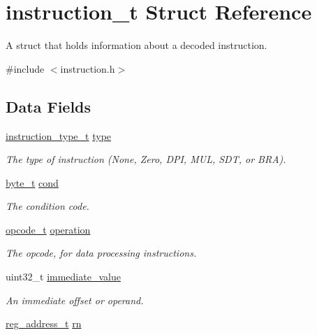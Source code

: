 \hypertarget{structinstruction__t}{}\section{instruction\+\_\+t Struct Reference}
\label{structinstruction__t}


A struct that holds information about a decoded instruction.  




{\ttfamily \#include $<$instruction.\+h$>$}

\subsection*{Data Fields}
\begin{DoxyCompactItemize}
\item 
\hyperlink{global_8h_aaba7165f28fb81b63cf5b0f1f9dcb40c}{instruction\+\_\+type\+\_\+t} \hyperlink{structinstruction__t_a3692cf5692ee00e944ee0cb5e69190e7}{type}
\begin{DoxyCompactList}\small\item\em The type of instruction (None, Zero, D\+PI, M\+UL, S\+DT, or B\+RA). \end{DoxyCompactList}\item 
\hyperlink{global_8h_a0661d7d1353e0bca70c64563f635b034}{byte\+\_\+t} \hyperlink{structinstruction__t_aafe48ca203b375c2b6373abd11192c3f}{cond}
\begin{DoxyCompactList}\small\item\em The condition code. \end{DoxyCompactList}\item 
\hyperlink{global_8h_a8d0559dcae6e251ff5663e79d5581c7d}{opcode\+\_\+t} \hyperlink{structinstruction__t_ae29eba9c0dfbec4abcd24cf4a927d2b7}{operation}
\begin{DoxyCompactList}\small\item\em The opcode, for data processing instructions. \end{DoxyCompactList}\item 
uint32\+\_\+t \hyperlink{structinstruction__t_a6137fca8ba59012415bd91175ecbc0c2}{immediate\+\_\+value}
\begin{DoxyCompactList}\small\item\em An immediate offset or operand. \end{DoxyCompactList}\item 
\hyperlink{global_8h_a462493a8f034b6ade38b69c49a39f52a}{reg\+\_\+address\+\_\+t} \hyperlink{structinstruction__t_a5ecf8ae8f3708affd90f22df5af80881}{rn}

\end{DoxyCompactItemize}
